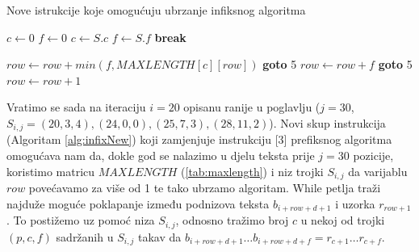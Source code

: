 \documentclass[times, utf8, zavrsni]{fer}
\begin{document}
\begin{algorithm}
\caption{Nove istrukcije koje omogućuju ubrzanje infiksnog algoritma}\label{alg:infixNew}
\begin{algorithmic}[1]
        	\State $c \gets 0$
        	\State $f \gets 0$
            		\State $c \gets S.c$
        			\State $f \gets S.f$
        			\State \textbf{break}
            	\EndIf
            \EndFor
            
            \State
            		\State $row \gets row + min(f,MAXLENGTH[c][row])$
            		\State \textbf{goto} 5
            	\Else
            		\State $row \gets row + f$
            	\EndIf
            \Else
            		\State \textbf{goto} 5
            	\Else
            		\State $row \gets row + 1$
            	\EndIf
            \EndIf
        \EndWhile
\end{algorithmic}
\end{algorithm}

Vratimo se sada na iteraciju $i=20$ opisanu ranije u poglavlju ($j=30$, $S_{i,j}=(20,3,4),(24,0,0),(25,7,3),(28,11,2)$). Novi skup instrukcija (Algoritam \ref{alg:infixNew}) koji zamjenjuje instrukciju [3] prefiksnog algoritma omogućava nam da, dokle god se nalazimo u djelu teksta prije $j=30$ pozicije, koristimo matricu $MAXLENGTH$ (\ref{tab:maxlength}) i niz trojki $S_{i,j}$ da varijablu $row$ povećavamo za više od 1 te tako ubrzamo algoritam. While petlja traži najduže moguće poklapanje između podnizova teksta $b_{i+row+d+1}$ i uzorka $r_{row+1}$. To postižemo uz pomoć niza $S_{i,j}$, odnosno tražimo broj $c$ u nekoj od trojki $(p,c,f)$ sadržanih u $S_{i,j}$ takav da $b_{i+row+d+1}\dots b_{i+row+d+f} = r_{c+1}\dots r_{c+f}$.
\end{document}
